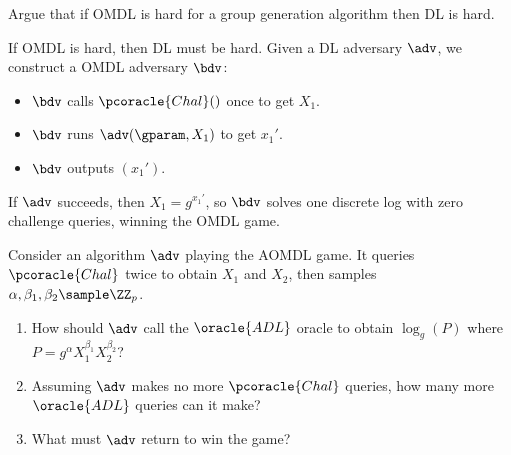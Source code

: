 \begin{exercise}
  Argue that if OMDL is hard for a group generation algorithm then DL is hard.
\end{exercise}

\ifsolutions
\begin{mysolution}
  If OMDL is hard, then DL must be hard.
  Given a \ppt DL adversary $\adv$, we construct a \ppt OMDL adversary $\bdv$:
  \begin{itemize}
    \item $\bdv$ calls $\pcoracle{Chal}()$ once to get $X_1$.
    \item $\bdv$ runs $\adv(\gparam, X_1)$ to get $x_1'$.
    \item $\bdv$ outputs $(x_1')$.
  \end{itemize}
  If $\adv$ succeeds, then $X_1 = g^{x_1'}$, so $\bdv$ solves one discrete log with zero challenge queries, winning the OMDL game.
\end{mysolution}
\fi

\begin{exercise}
  Consider an algorithm $\adv$ playing the AOMDL game. It queries $\pcoracle{Chal}$ twice to obtain $X_1$ and $X_2$, then samples $\alpha, \beta_1, \beta_2 \sample \ZZ_p$. 
  \begin{enumerate}
    \item How should $\adv$ call the $\oracle{ADL}$ oracle to obtain $\log_g(P)$ where $P = g^\alpha X_1^{\beta_1} X_2^{\beta_2}$?
    \item Assuming $\adv$ makes no more $\pcoracle{Chal}$ queries, how many more $\oracle{ADL}$ queries can it make?
    \item What must $\adv$ return to win the game?
  \end{enumerate}
\end{exercise}

